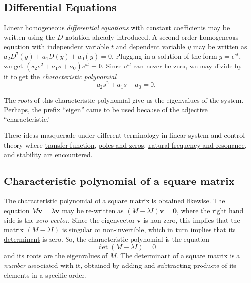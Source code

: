 \documentclass[
  12pt,
  a4paper,
]{article}
\begin{document}
\hypertarget{differential-equations}{%
\subsection{Differential Equations}\label{differential-equations}}

Linear homogeneous \emph{differential equations} with constant
coefficients may be written using the \(D\) notation already introduced.
A second order homogeneous equation with independent variable \(t\) and
dependent variable \(y\) may be written as
\(a_2D^2(y) + a_1D(y) + a_0(y) = 0\). Plugging in a solution of the form
\(y = e^{st}\), we get \((a_2s^2 + a_1s + a_0)e^{st} = 0.\) Since
\(e^{st}\) can never be zero, we may divide by it to get the
\emph{characteristic polynomial} \begin{equation}
a_2s^2 + a_1s + a_0 = 0.
\label{eq:cp}\end{equation}

The \emph{roots} of this characteristic polynomial give us the
eigenvalues of the system. Perhaps, the prefix ``eigen'' came to be used
because of the adjective ``characteristic.''

These ideas masquerade under different terminology in linear system and
control theory where
\href{https://en.wikipedia.org/wiki/Transfer_function}{transfer
function},
\href{http://web.mit.edu/2.14/www/Handouts/PoleZero.pdf}{poles and
zeros}, \href{https://www.youtube.com/watch?v=hcXbyS2Cf2o}{natural
frequency and resonance}, and
\href{https://en.wikibooks.org/wiki/Control_Systems/Stability}{stability}
are encountered.

\hypertarget{characteristic-polynomial-of-a-square-matrix}{%
\subsection{Characteristic polynomial of a square
matrix}\label{characteristic-polynomial-of-a-square-matrix}}

The characteristic polynomial of a square matrix is obtained likewise.
The equation \(M\boldsymbol{v} = \lambda \boldsymbol{v}\) may be
re-written as \((M -\lambda I)\boldsymbol{v}=\boldsymbol{0}\), where the
right hand side is the \emph{zero vector}. Since the eigenvector
\(\boldsymbol{v}\) is non-zero, this implies that the matrix
\((M -\lambda I)\) is
\href{https://en.wikipedia.org/wiki/Invertible_matrix}{singular} or
non-invertible, which in turn implies that its
\href{https://en.wikipedia.org/wiki/Determinant}{determinant} is zero.
So, the characteristic polynomial is the equation
\begin{equation}\det(M - \lambda I) = 0
\label{eq:cp-matrix}\end{equation} and its roots are the eigenvalues of
\(M\). The determinant of a square matrix is a \emph{number} associated
with it, obtained by adding and subtracting products of its elements in
a specific order.
\end{document}
